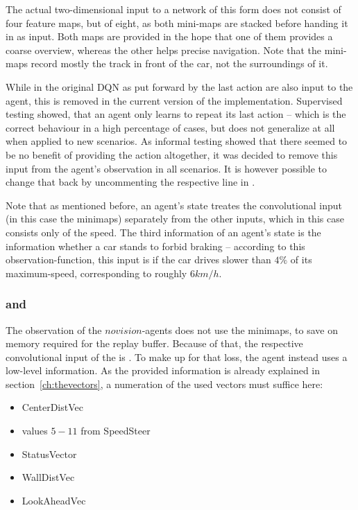 The actual two-dimensional input to a network of this form does not consist of four feature maps, but of eight, as both mini-maps are stacked before handing it in as input. Both maps are provided in the hope that one of them provides a coarse overview, whereas the other helps precise navigation. Note that the mini-maps record mostly the track in front of the car, not the surroundings of it.

While in the original DQN as put forward by \citet{mnih_human-level_2015} the last action are also input to the agent, this is removed in the current version of the implementation. Supervised testing showed, that an agent only learns to repeat its last action -- which is the correct behaviour in a high percentage of cases, but does not generalize at all when applied to new scenarios. As informal testing showed that there seemed to be no benefit of providing the action altogether, it was decided to remove this input from the agent's observation in all scenarios. It is however possible to change that back by uncommenting the respective line in .

Note that as mentioned before, an agent's state treates the convolutional input (in this case the minimaps) separately from the other inputs, which in this case consists only of the speed. The third information of an agent's state is the information whether a car stands to forbid braking -- according to this observation-function, this input is  if the car drives slower than $4\%$ of its maximum-speed, corresponding to roughly $6km/h$.

\subsubsection{ and }

The observation of the $novision$-agents does not use the minimaps, to save on memory required for the replay buffer. Because of that, the respective convolutional input of the  is . To make up for that loss, the agent instead uses a low-level information. As the provided information is already explained in section~\ref{ch:thevectors}, a numeration of the used vectors must suffice here:
\begin{itemize}[noitemsep]
	\item CenterDistVec
	\item values $5-11$ from SpeedSteer 
	\item StatusVector
	\item WallDistVec
	\item LookAheadVec
\end{itemize}

